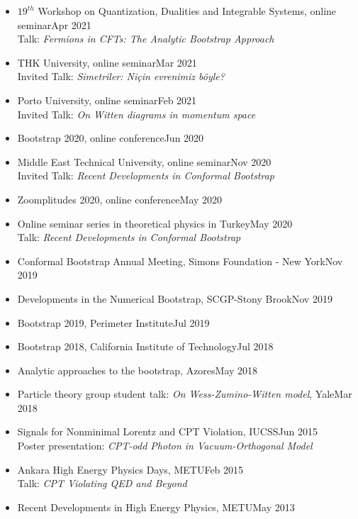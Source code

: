 \documentclass[a4paper,11pt]{article}
\begin{document}
\begin{itemize}[itemsep=.001em]
	\item[] $19^{th}$ Workshop on
	Quantization, Dualities and Integrable Systems, online seminar\hfill Apr 2021
	\\
	\hspace*{1.8em}Talk: \emph{Fermions in CFTs: The Analytic Bootstrap Approach}
	\item[] THK University, online seminar\hfill Mar 2021
\\
\hspace*{1.8em}Invited Talk: \emph{Simetriler: Niçin evrenimiz böyle?}
	\item[] Porto University, online seminar\hfill Feb 2021
\\
\hspace*{1.8em}Invited Talk: \emph{On Witten diagrams in momentum space}
	\item[] Bootstrap 2020, online conference\hfill Jun 2020
	\item[] Middle East Technical University, online seminar\hfill Nov 2020\\
\hspace*{1.8em} Invited Talk: \emph{Recent Developments in Conformal Bootstrap}
	\item[] Zoomplitudes 2020, online conference\hfill May 2020
	\item[] Online seminar series in theoretical physics in Turkey\hfill May 2020\\
	\hspace*{1.8em}Talk: \emph{Recent Developments in Conformal Bootstrap}
	\item[] Conformal Bootstrap Annual Meeting, Simons Foundation - New York\hfill Nov 2019
	\item[] Developments in the Numerical Bootstrap, SCGP-Stony Brook\hfill Nov 2019\\
	\item[] Bootstrap 2019, Perimeter Institute\hfill Jul 2019
	\item[]Bootstrap 2018, California Institute of Technology\hfill  Jul 2018
	\item[] Analytic approaches to the bootstrap, Azores\hfill May 2018
	\item[] Particle theory group student talk: \emph{On Wess-Zumino-Witten model}, Yale\hfill Mar 2018
	\item[] Signals for Nonminimal Lorentz and CPT Violation, IUCSS\hfill Jun 2015\\
					\hspace*{1.8em}Poster presentation: \emph{CPT-odd Photon in Vacuum-Orthogonal Model}
	\item[] Ankara High Energy Physics Days, METU\hfill Feb 2015\\
					\hspace*{1.8em}Talk: \emph{CPT Violating QED and Beyond}
	\item[] Recent Developments in High Energy Physics, METU\hfill May 2013
\end{itemize}
\end{document}
